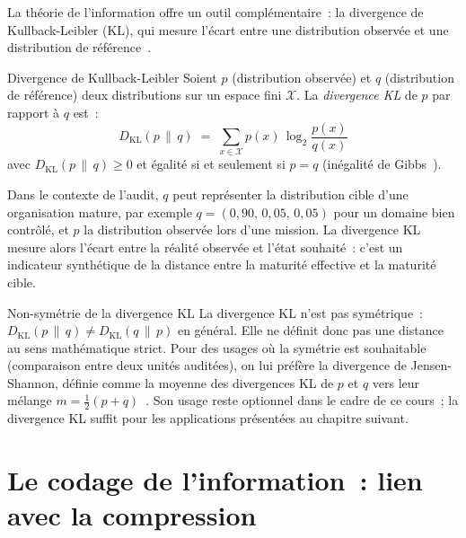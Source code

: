 La théorie de l'information offre un outil complémentaire~: la divergence de
Kullback-Leibler (KL), qui mesure l'écart entre une distribution observée et une
distribution de référence~\cite{Kullback1951}.

\begin{boxdef}{Divergence de Kullback-Leibler}
Soient $p$ (distribution observée) et $q$ (distribution de référence) deux
distributions sur un espace fini $\mathcal{X}$. La \emph{divergence KL} de $p$
par rapport à $q$ est~:
\begin{equation}
  D_{\mathrm{KL}}(p \,\|\, q) \;=\; \sum_{x \in \mathcal{X}} p(x)\,\log_2\frac{p(x)}{q(x)}
  \label{eq:kl-div}
\end{equation}
avec $D_{\mathrm{KL}}(p \,\|\, q) \geq 0$ et égalité si et seulement si $p = q$
(inégalité de Gibbs~\cite{Cover2006}).
\end{boxdef}

Dans le contexte de l'audit, $q$ peut représenter la distribution cible d'une
organisation mature, par exemple $q = (0{,}90,\,0{,}05,\,0{,}05)$ pour
un domaine bien contrôlé, et $p$ la distribution observée lors d'une mission.
La divergence KL mesure alors l'écart entre la réalité observée et l'état
souhaité~: c'est un indicateur synthétique de la distance entre la maturité
effective et la maturité cible.

\begin{boiteRemarque}{Non-symétrie de la divergence KL}
La divergence KL n'est pas symétrique~: $D_{\mathrm{KL}}(p \,\|\, q) \neq
D_{\mathrm{KL}}(q \,\|\, p)$ en général. Elle ne définit donc pas une distance
au sens mathématique strict. Pour des usages où la symétrie est souhaitable
(comparaison entre deux unités auditées), on lui préfère la divergence de Jensen-Shannon,
définie comme la moyenne des divergences KL de $p$ et $q$ vers leur mélange
$m = \frac{1}{2}(p+q)$~\cite{Lin1991}. Son usage reste optionnel dans le cadre de
ce cours~; la divergence KL suffit pour les applications présentées au chapitre
suivant.
\end{boiteRemarque}

\section{Le codage de l'information~: lien avec la compression}
\label{sec:codage}

